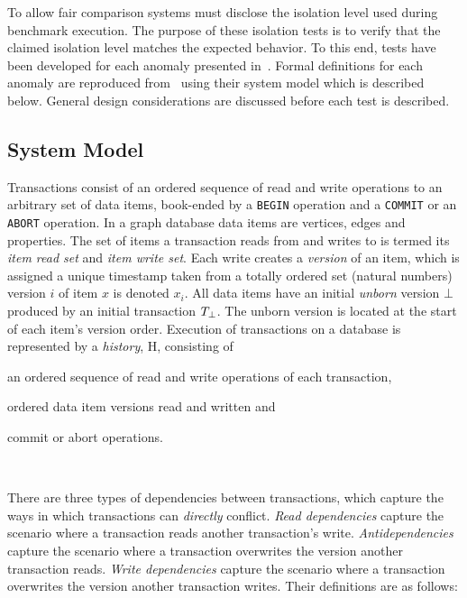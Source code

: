 To allow fair comparison systems must disclose the isolation level used
during benchmark execution. The purpose of these isolation tests is to verify
that the claimed isolation level matches the expected behavior. To this end,
tests have been developed for each anomaly presented
in~\cite{DBLP:journals/tods/BailisFGHS16}. Formal definitions for each anomaly
are reproduced from~\cite{adya1999weak,DBLP:journals/tods/BailisFGHS16} using
their system model which is described below. General design considerations are
discussed before each test is described.

\subsection{System Model}
\label{sec:system-model}

Transactions consist of an ordered sequence of read and write operations to an
arbitrary set of data items, book-ended by a \texttt{BEGIN} operation and a
\texttt{COMMIT} or an \texttt{ABORT} operation. In a graph database data items
are vertices, edges and properties. The set of items a transaction reads from and
writes to is termed its \emph{item read set} and \emph{item write set}. Each
write creates a \emph{version} of an item, which is assigned a unique timestamp
taken from a totally ordered set (\eg natural numbers) version $i$ of item $x$
is denoted $x_i$. All data items have an initial \emph{unborn} version $\bot$
produced by an initial transaction $T_{\bot}$. The unborn version is
located at the start of each item's version order. Execution of transactions
on a database is represented by a \emph{history}, H, consisting of
\begin{enumerate*}[label={(\roman*)}]
  \item an ordered sequence of read and write operations of each transaction,
  \item ordered data item versions read and written and
  \item commit or abort operations.
\end{enumerate*}~\cite{DBLP:journals/tods/BailisFGHS16}

There are three types of dependencies between transactions, which capture the
ways in which transactions can \emph{directly} conflict. \emph{Read dependencies}
capture the scenario where a transaction reads another transaction's write.
\emph{Antidependencies} capture the scenario where a transaction overwrites the
version another transaction reads. \emph{Write dependencies} capture the
scenario where a transaction overwrites the version another transaction writes.
Their definitions are as follows:

